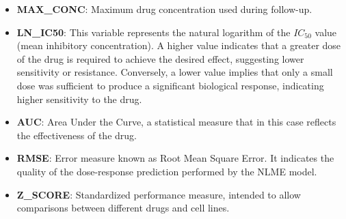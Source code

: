 \begin{enumerate}
\begin{itemize}
        \item \textbf{MAX\_CONC}: Maximum drug concentration used during follow-up.
        \item \textbf{LN\_IC50}: This variable represents the natural logarithm of the $IC_{50}$ value (mean inhibitory concentration). A higher value indicates that a greater dose of the drug is required to achieve the desired effect, suggesting lower sensitivity or resistance. Conversely, a lower value implies that only a small dose was sufficient to produce a significant biological response, indicating higher sensitivity to the drug.
        \item \textbf{AUC}: Area Under the Curve, a statistical measure that in this case reflects the effectiveness of the drug.
        \item \textbf{RMSE}: Error measure known as Root Mean Square Error. It indicates the quality of the dose-response prediction performed by the NLME model.
        \item \textbf{Z\_SCORE}: Standardized performance measure, intended to allow comparisons between different drugs and cell lines.
      \end{itemize}


\end{enumerate}
